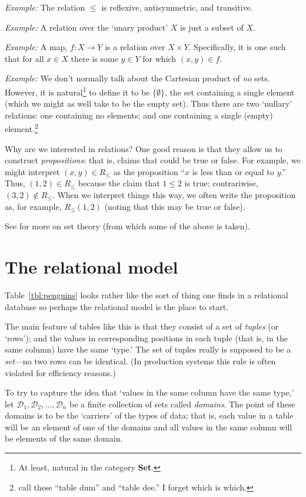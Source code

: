 \documentclass[10pt, a4paper, twocolumn]{article}
\begin{document}
\emph{Example:} The relation $\leq$ is reflexive, antisymmetric, and transitive.

\emph{Example:} A relation over the `unary product' $X$ is just a subset of $X$.

\emph{Example:} A map, $f:X\to Y$ is a relation over $X\times Y$. Specifically, it is
one such that for all $x\in X$ there is some $y\in Y$ for which $(x, y)\in f$.

\emph{Example:} We don't normally talk about the Cartesian product of \emph{no}
sets. However, it is natural\footnote{At least, natural in the category
\textbf{\textsf{Set}}.} to define it to be $\{\emptyset\}$, the set containing a single
element (which we might as well take to be the empty set). Thus there are two
`nullary' relations: one containing no elements; and one containing a single
(empty) element.\footnote{\textcite{darwendate2006ttm} call these ``table dum''
and ``table dee.'' I forget which is which.}

Why are we interested in relations? One good reason is that they allow us to
construct \emph{propositions}: that is, claims that could be true or false. For
example, we might interpret $(x, y)\in R_\leq$ as the proposition ``$x$ is less than
or equal to $y$.'' Thus, $(1, 2)\in R_\leq$ because the claim that $1\leq 2$ is true;
contrariwise, $(3, 2)\notin R_\leq$. When we interpret things this way, we often write
the proposition as, for example, $R_\leq(1, 2)$ (noting that this may be true or
false).


See \textcite{cameron1999sets} for more on set theory (from which some of the
above is taken).


\section{The relational model}

Table~\ref{tbl:penguins} looks rather like the sort of thing one finds in a
relational database so perhaps the relational model is the place to start.

The main feature of tables like this is that they consist of a set of
\emph{tuples} (or `rows'); and the values in corresponding positions in each
tuple (that is, in the same column) have the same `type.' The set of tuples
really is supposed to be a \emph{set}---no two rows can be identical. (In
production systems this rule is often violated for efficiency reasons.)

To try to capture the idea that `values in the same column have the same type,'
let $\mathscr{D}_1, \mathscr{D}_2, \dots, \mathscr{D}_n$ be a finite collection
of sets called \emph{domains}. The point of these domains is to be the
`carriers' of the types of data; that is, each value in a table will be an
element of one of the domains and all values in the same column will be
elements of the same domain.
\end{document}

